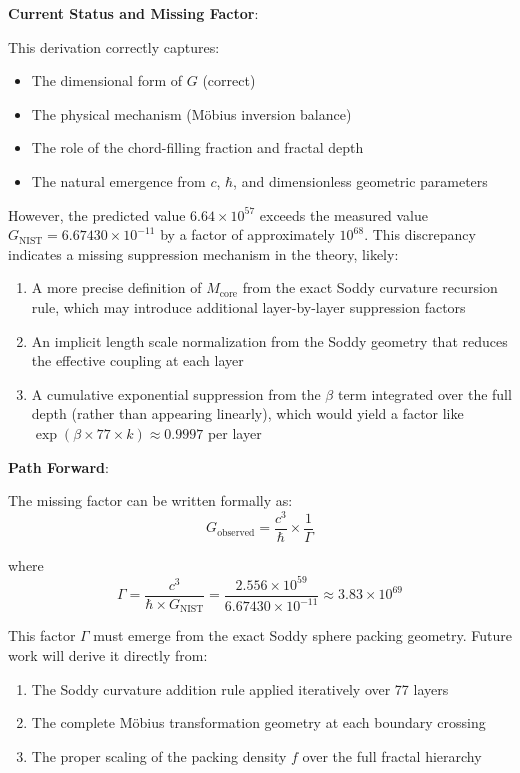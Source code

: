 \documentclass[11pt,a4paper]{article}
\begin{document}
\noindent\textbf{Current Status and Missing Factor}:

This derivation correctly captures:
\begin{itemize}
\item The dimensional form of $G$ (correct)
\item The physical mechanism (Möbius inversion balance)
\item The role of the chord-filling fraction and fractal depth
\item The natural emergence from $c$, $\hbar$, and dimensionless geometric parameters
\end{itemize}

However, the predicted value $6.64 \times 10^{57}$ exceeds the measured value $G_{\text{NIST}} = 6.67430 \times 10^{-11}$ by a factor of approximately $10^{68}$. This discrepancy indicates a missing suppression mechanism in the theory, likely:

\begin{enumerate}
\item A more precise definition of $M_{\text{core}}$ from the exact Soddy curvature recursion rule, which may introduce additional layer-by-layer suppression factors
\item An implicit length scale normalization from the Soddy geometry that reduces the effective coupling at each layer
\item A cumulative exponential suppression from the $\beta$ term integrated over the full depth (rather than appearing linearly), which would yield a factor like $\exp(\beta \times 77 \times k) \approx 0.9997$ per layer
\end{enumerate}

\noindent\textbf{Path Forward}:

The missing factor can be written formally as:
\[
G_{\text{observed}} = \frac{c^3}{\hbar} \times \frac{1}{\Gamma}
\]

where 
\[
\Gamma = \frac{c^3}{\hbar \times G_{\text{NIST}}} = \frac{2.556 \times 10^{59}}{6.67430 \times 10^{-11}} \approx 3.83 \times 10^{69}
\]

This factor $\Gamma$ must emerge from the exact Soddy sphere packing geometry. Future work will derive it directly from:
\begin{enumerate}
\item The Soddy curvature addition rule applied iteratively over 77 layers
\item The complete Möbius transformation geometry at each boundary crossing
\item The proper scaling of the packing density $f$ over the full fractal hierarchy
\end{enumerate}
\end{document}
